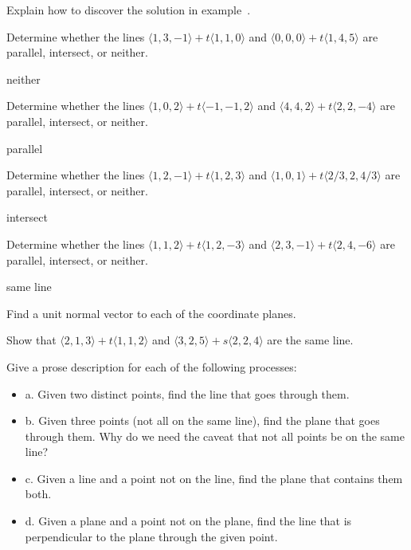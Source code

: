 \begin{exercises}
\exercise Explain how to discover the solution in
example~.

\exercise Determine whether the lines $\langle 1,3,-1\rangle+t\langle
1,1,0\rangle$ and $\langle 0,0,0\rangle+t\langle 1,4,5\rangle$ are
parallel, intersect, or neither.
\begin{answer} neither
\end{answer}

\exercise Determine whether the lines $\langle 1,0,2\rangle+t\langle
-1,-1,2\rangle$ and $\langle 4,4,2\rangle+t\langle 2,2,-4\rangle$ are
parallel, intersect, or neither.
\begin{answer} parallel
\end{answer}

\exercise Determine whether the lines $\langle 1,2,-1\rangle+t\langle
1,2,3\rangle$ and $\langle 1,0,1\rangle+t\langle 2/3,2,4/3\rangle$ are
parallel, intersect, or neither.
\begin{answer} intersect
\end{answer}

\exercise Determine whether the lines $\langle 1,1,2\rangle+t\langle
1,2,-3\rangle$ and $\langle 2,3,-1\rangle+t\langle 2,4,-6\rangle$ are
parallel, intersect, or neither.
\begin{answer} same line
\end{answer}

\exercise Find a unit normal vector to each of the coordinate planes.

\exercise Show that $\langle 2,1,3 \rangle + t \langle 1,1,2 \rangle$ and
$\langle 3, 2, 5 \rangle + s \langle 2, 2, 4 \rangle$ are the same
line.

\exercise Give a prose description for each of the following processes:

\begin{itemize} %

\item{a.} Given two distinct points, find the line that goes through them.

\item{b.} Given three points (not all on the same line), find the plane
  that goes through them. Why do we need the caveat that not all
  points be on the same line?

\item{c.} Given a line and a point not on the line, find the plane that
contains them both.

\item{d.} Given a plane and a point not on the plane, find the line that
is perpendicular to the plane through the given point.


\end{itemize}
\end{exercises}
